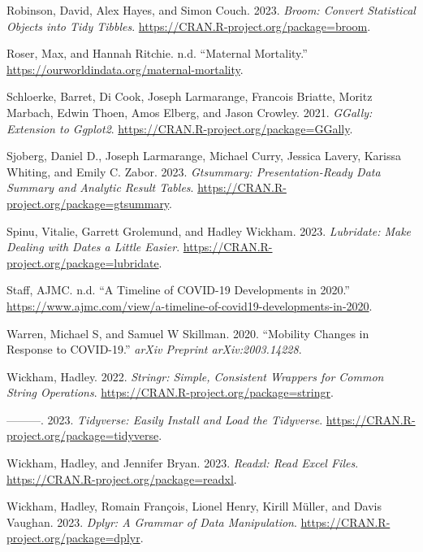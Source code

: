 \documentclass[
  letterpaper,
]{krantz}
\newlength{\cslhangindent}
\newlength{\cslentryspacingunit} %
\newenvironment{CSLReferences}[2] %
 {%
  \setlength{\parindent}{0pt}
  \ifodd #1
  \let\oldpar\par
  \def\par{\hangindent=\cslhangindent\oldpar}
  \fi
  \setlength{\parskip}{#2\cslentryspacingunit}
 }%
 {}
\begin{document}
\begin{CSLReferences}{1}{0}
\leavevmode{}%
Robinson, David, Alex Hayes, and Simon Couch. 2023. \emph{Broom: Convert
Statistical Objects into Tidy Tibbles}.
\url{https://CRAN.R-project.org/package=broom}.

\leavevmode{}%
Roser, Max, and Hannah Ritchie. n.d. {``Maternal Mortality.''}
\url{https://ourworldindata.org/maternal-mortality}.

\leavevmode{}%
Schloerke, Barret, Di Cook, Joseph Larmarange, Francois Briatte, Moritz
Marbach, Edwin Thoen, Amos Elberg, and Jason Crowley. 2021.
\emph{GGally: Extension to Ggplot2}.
\url{https://CRAN.R-project.org/package=GGally}.

\leavevmode{}%
Sjoberg, Daniel D., Joseph Larmarange, Michael Curry, Jessica Lavery,
Karissa Whiting, and Emily C. Zabor. 2023. \emph{Gtsummary:
Presentation-Ready Data Summary and Analytic Result Tables}.
\url{https://CRAN.R-project.org/package=gtsummary}.

\leavevmode{}%
Spinu, Vitalie, Garrett Grolemund, and Hadley Wickham. 2023.
\emph{Lubridate: Make Dealing with Dates a Little Easier}.
\url{https://CRAN.R-project.org/package=lubridate}.

\leavevmode{}%
Staff, AJMC. n.d. {``A Timeline of COVID-19 Developments in 2020.''}
\url{https://www.ajmc.com/view/a-timeline-of-covid19-developments-in-2020}.

\leavevmode{}%
Warren, Michael S, and Samuel W Skillman. 2020. {``Mobility Changes in
Response to COVID-19.''} \emph{arXiv Preprint arXiv:2003.14228}.

\leavevmode{}%
Wickham, Hadley. 2022. \emph{Stringr: Simple, Consistent Wrappers for
Common String Operations}.
\url{https://CRAN.R-project.org/package=stringr}.

\leavevmode{}%
---------. 2023. \emph{Tidyverse: Easily Install and Load the
Tidyverse}. \url{https://CRAN.R-project.org/package=tidyverse}.

\leavevmode{}%
Wickham, Hadley, and Jennifer Bryan. 2023. \emph{Readxl: Read Excel
Files}. \url{https://CRAN.R-project.org/package=readxl}.

\leavevmode{}%
Wickham, Hadley, Romain François, Lionel Henry, Kirill Müller, and Davis
Vaughan. 2023. \emph{Dplyr: A Grammar of Data Manipulation}.
\url{https://CRAN.R-project.org/package=dplyr}.


\end{CSLReferences}
\end{document}
